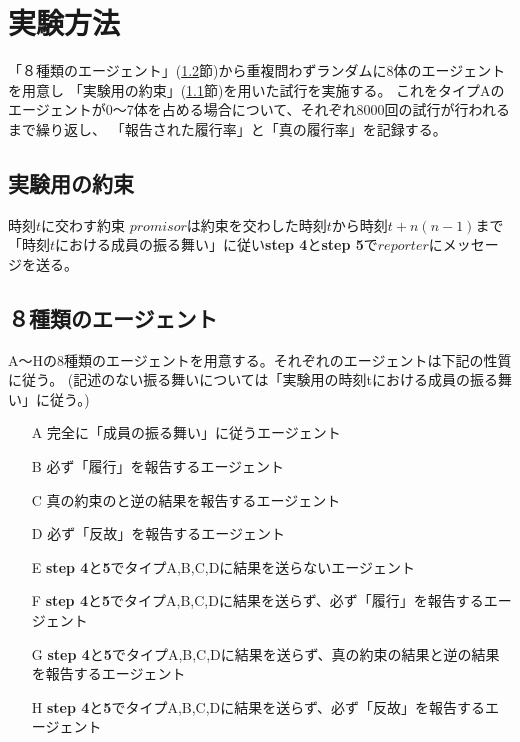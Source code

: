 \section{実験方法}
  「８種類のエージェント」(\ref{agentsForExperiments2}節)から重複問わずランダムに8体のエージェントを用意し
  「実験用の約束」(\ref{promiseForExperiments}節)を用いた試行を実施する。
  これをタイプAのエージェントが0〜7体を占める場合について、それぞれ8000回の試行が行われるまで繰り返し、
  「報告された履行率」と「真の履行率」を記録する。

  \subsection{実験用の約束}
  \label{promiseForExperiments}
  \begin{itembox}[l]{時刻$t$に交わす約束}
    $promisor$は約束を交わした時刻$t$から時刻$t+n(n-1)$まで「時刻$t$における成員の振る舞い」に従い\textbf{step 4}と\textbf{step 5}で$reporter$にメッセージを送る。
  \end{itembox}

  \subsection{８種類のエージェント}
  \label{agentsForExperiments2}
    A〜Hの8種類のエージェントを用意する。それぞれのエージェントは下記の性質に従う。
    (記述のない振る舞いについては「実験用の時刻tにおける成員の振る舞い」に従う。)
    \begin{itemize}
      \item[A] 完全に「成員の振る舞い」に従うエージェント
      \item[B] 必ず「履行」を報告するエージェント
      \item[C] 真の約束のと逆の結果を報告するエージェント
      \item[D] 必ず「反故」を報告するエージェント
      \item[E] \textbf{step 4}と\textbf{5}でタイプA,B,C,Dに結果を送らないエージェント
      \item[F] \textbf{step 4}と\textbf{5}でタイプA,B,C,Dに結果を送らず、必ず「履行」を報告するエージェント
      \item[G] \textbf{step 4}と\textbf{5}でタイプA,B,C,Dに結果を送らず、真の約束の結果と逆の結果を報告するエージェント
      \item[H] \textbf{step 4}と\textbf{5}でタイプA,B,C,Dに結果を送らず、必ず「反故」を報告するエージェント
    \end{itemize}

